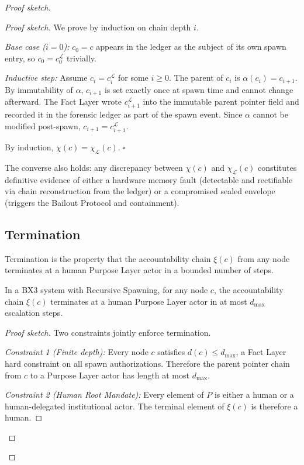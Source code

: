 \begin{proof}[Proof sketch]
\begin{proof}[Proof sketch]
We prove by induction on chain depth $i$.

\textit{Base case ($i = 0$):} $c_0 = c$ appears in the ledger as the subject of its own spawn entry, so $c_0 = c_0^{\mathcal{L}}$ trivially.

\textit{Inductive step:} Assume $c_i = c_i^{\mathcal{L}}$ for some $i \geq 0$. The parent of $c_i$ is $\alpha(c_i) = c_{i+1}$. By immutability of $\alpha$, $c_{i+1}$ is set exactly once at spawn time and cannot change afterward. The Fact Layer wrote $c_{i+1}^{\mathcal{L}}$ into the immutable parent pointer field and recorded it in the forensic ledger as part of the spawn event. Since $\alpha$ cannot be modified post-spawn, $c_{i+1} = c_{i+1}^{\mathcal{L}}$.

By induction, $\chi(c) = \chi_{\mathcal{L}}(c)$. $\square$
\endproof

The converse also holds: any discrepancy between $\chi(c)$ and $\chi_{\mathcal{L}}(c)$ constitutes definitive evidence of either a hardware memory fault (detectable and rectifiable via chain reconstruction from the ledger) or a compromised sealed envelope (triggers the Bailout Protocol and containment).

\subsection{Termination}
\label{sec:termination}

Termination is the property that the accountability chain $\xi(c)$ from any node terminates at a human Purpose Layer actor in a bounded number of steps.

\begin{thrm}[Termination]
\label{thrm:termination}
In a BX3 system with Recursive Spawning, for any node $c$, the accountability chain $\xi(c)$ terminates at a human Purpose Layer actor in at most $d_{\max}$ escalation steps.
\end{thrm}

\begin{proof}[Proof sketch]
Two constraints jointly enforce termination.

\textit{Constraint 1 (Finite depth):} Every node $c$ satisfies $d(c) \leq d_{\max}$, a Fact Layer hard constraint on all spawn authorizations. Therefore the parent pointer chain from $c$ to a Purpose Layer actor has length at most $d_{\max}$.

\textit{Constraint 2 (Human Root Mandate):} Every element of $P$ is either a human or a human-delegated institutional actor. The terminal element of $\xi(c)$ is therefore a human.


\end{proof}
\end{proof}
\end{proof}
